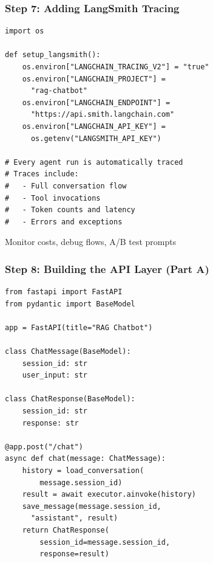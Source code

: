 \documentclass[aspectratio=169,11pt]{beamer}
\begin{document}
\begin{frame}[fragile]
  \frametitle{Step 7: Adding LangSmith Tracing}

  \begin{lstlisting}
import os

def setup_langsmith():
    os.environ["LANGCHAIN_TRACING_V2"] = "true"
    os.environ["LANGCHAIN_PROJECT"] =
      "rag-chatbot"
    os.environ["LANGCHAIN_ENDPOINT"] =
      "https://api.smith.langchain.com"
    os.environ["LANGCHAIN_API_KEY"] =
      os.getenv("LANGSMITH_API_KEY")

# Every agent run is automatically traced
# Traces include:
#   - Full conversation flow
#   - Tool invocations
#   - Token counts and latency
#   - Errors and exceptions
  \end{lstlisting}

  \begin{tipbox}[Benefits]
    \small Monitor costs, debug flows, A/B test prompts
  \end{tipbox}
\end{frame}

\begin{frame}[fragile]
  \frametitle{Step 8: Building the API Layer (Part A)}

  \begin{lstlisting}
from fastapi import FastAPI
from pydantic import BaseModel

app = FastAPI(title="RAG Chatbot")

class ChatMessage(BaseModel):
    session_id: str
    user_input: str

class ChatResponse(BaseModel):
    session_id: str
    response: str

@app.post("/chat")
async def chat(message: ChatMessage):
    history = load_conversation(
        message.session_id)
    result = await executor.ainvoke(history)
    save_message(message.session_id,
      "assistant", result)
    return ChatResponse(
        session_id=message.session_id,
        response=result)
  \end{lstlisting}
\end{frame}
\end{document}
